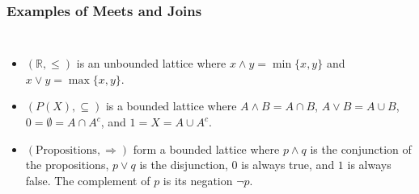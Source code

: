 \documentclass{beamer}
\begin{document}
\begin{frame}

	\frametitle{Examples of Meets and Joins}
	
	\begin{example}
		
		\begin{columns}

			\begin{itemize}
		
				\item $(\mathbb{R},\leq)$ is an unbounded lattice where $x\wedge y=\min\{x,y\}$ and $x\vee y=\max\{x,y\}$.
		
				\item $(P(X),\subseteq)$ is a bounded lattice where $A\wedge B=A\cap B$, $A\vee B=A\cup B$, $0=\emptyset=A\cap A^c$, and $1=X=A\cup A^c$.
			
				\item $(\text{Propositions},\Rightarrow)$ form a bounded lattice where $p\wedge q$ is the conjunction of the propositions, $p\vee q$ is the disjunction, $0$ is always true, and $1$ is always false. The complement of $p$ is its negation $\neg p$.
		
			\end{itemize}	
			
			
	
		\end{columns}	
		
	\end{example}

\end{frame}
\end{document}
